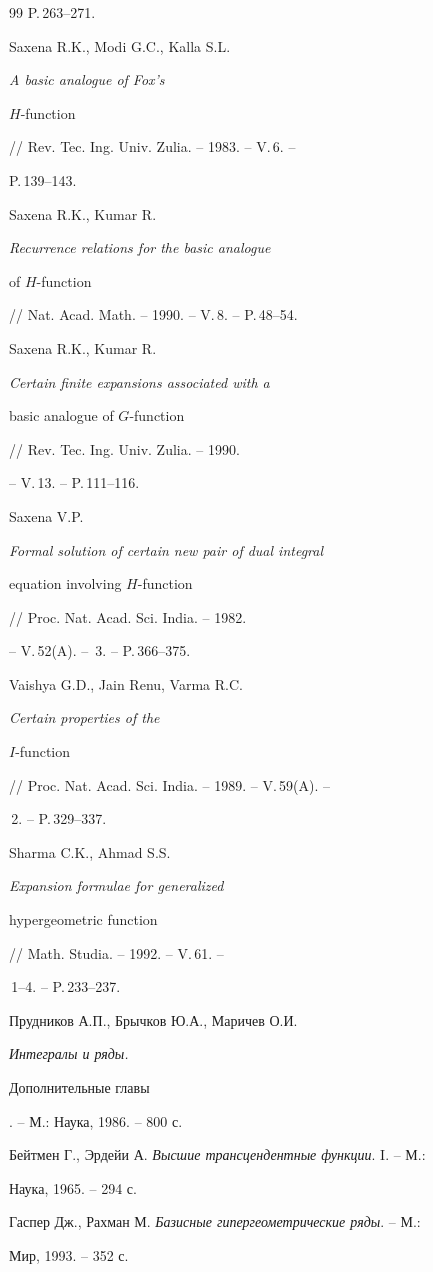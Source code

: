 \begin{thebibliography}{99}
P.\,263--271. 




Saxena R.K., Modi G.C., Kalla S.L. {\em A basic analogue of Fox's 


$H$-function} // Rev. Tec. Ing. Univ. Zulia. -- 1983. -- V.\,6. -- 


P.\,139--143. 




Saxena R.K., Kumar R. {\em Recurrence relations for the basic analogue 


of $H$-function} // Nat. Acad. Math. -- 1990. -- V.\,8. -- P.\,48--54. 




Saxena R.K., Kumar R. {\em Certain finite expansions associated with a 


basic analogue of $G$-function} // Rev. Tec. Ing. Univ. Zulia. -- 1990. 


-- V.\,13. -- P.\,111--116. 




Saxena V.P. {\em Formal solution of certain new pair of dual integral 


equation involving $H$-function} // Proc. Nat. Acad. Sci. India. -- 1982.


-- V.\,52(A). -- \No\,3. -- P.\,366--375. 




Vaishya G.D., Jain Renu, Varma R.C. {\em Certain properties of the 


$I$-function} // Proc. Nat. Acad. Sci. India. -- 1989. -- V.\,59(A). -- 


\No\,2. -- P.\,329--337. 




Sharma C.K., Ahmad S.S. {\em Expansion formulae for generalized 


hypergeometric function} // Math. Studia. -- 1992. -- V.\,61. -- 


\No\,1--4. -- P.\,233--237. 




Прудников А.П., Брычков Ю.А., Маричев О.И. {\em Интегралы и ряды. 


Дополнительные главы}. -- М.: Наука, 1986. -- 800 с. 




Бейтмен Г., Эрдейи А. {\em Высшие трансцендентные функции}. I. -- М.: 


Наука, 1965. -- 294 с. 




Гаспер Дж., Рахман М. {\em Базисные гипергеометрические ряды}. -- М.: 


Мир, 1993. -- 352 с. 


 


\end{thebibliography} 


